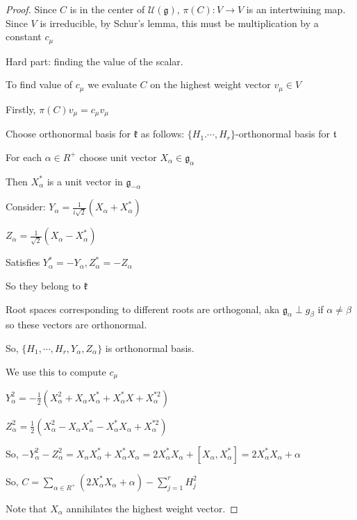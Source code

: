 \documentclass{article}
\theoremstyle{definition}
\begin{document}
\begin{proof}
    Since \(C\) is in the center of \(\mathcal{U}(\mathfrak{g})\), \(\pi(C):V\to V\) is an intertwining map. Since \(V\) is irreducible, by Schur's lemma, this must be multiplication by a constant \(c_\mu\) 

    Hard part: finding the value of the scalar.

    To find value of \(c_\mu\) we evaluate \(C\) on the highest weight vector \(v_\mu \in V\)
    
    Firstly, \(\pi(C)v_\mu =c_\mu v_\mu\) 

    Choose orthonormal basis for \(\mathfrak{k}\) as follows: \(\{ H_1. \cdots, H_r \} \)-orthonormal basis for \(\mathfrak{t}\)
    
    For each \(\alpha \in R^+\) choose unit vector \(X_\alpha \in \mathfrak{g}_\alpha\)
    
    Then \(X_\alpha^{\ast}\) is a unit vector in \(\mathfrak{g}_{-\alpha}\)
    
    Consider: \(Y_\alpha = \frac{1}{i \sqrt{2} }(X_\alpha +X_\alpha ^{\ast})\)
    
    \(Z_\alpha = \frac{1}{\sqrt{2}}(X_\alpha - X_\alpha ^{\ast} )\) 

    Satisfies \(Y_\alpha^{\ast} =-Y_\alpha , Z_\alpha ^{\ast} = -Z_\alpha\)
    
    So they belong to \(\mathfrak{k}\)
    
    Root spaces corresponding to different roots are orthogonal, aka \(\mathfrak{g}_\alpha {\perp} g_\beta \) if \(\alpha \neq \beta\) so these vectors are orthonormal.
    
    So, \(\{ H_1,\cdots,H_r,Y_\alpha ,Z_\alpha \} \) is orthonormal basis.

    We use this to compute \(c_\mu\)

    \(Y_\alpha^2 = - \frac{1}{2}(X_\alpha^2 + X_\alpha X_\alpha ^{\ast} + X_\alpha ^{\ast} X + X_\alpha ^{\ast 2})\)
    
    \(Z_\alpha^2 = \frac{1}{2}(X_\alpha ^2 - X_\alpha X_\alpha ^{\ast} -X_\alpha ^{\ast} X_\alpha +X_\alpha ^{\ast 2} )\)
    
    So, \(- Y_\alpha ^2 - Z_\alpha ^2 = X_\alpha X_\alpha ^{\ast} +X_\alpha^{\ast} X_\alpha = 2 X_\alpha ^{\ast} X_\alpha +[X_\alpha ,X_\alpha^{\ast} ]=2X_\alpha ^{\ast} X_\alpha + \alpha\)
    
    So, \(C = \sum_{\alpha \in R^+} (2 X_\alpha ^{\ast} X_\alpha + \alpha) - \sum_{j=1} ^ r H_j^2 \) 

    Note that \(X_\alpha\) annihilates the highest weight vector.
    

\end{proof}
\end{document}
